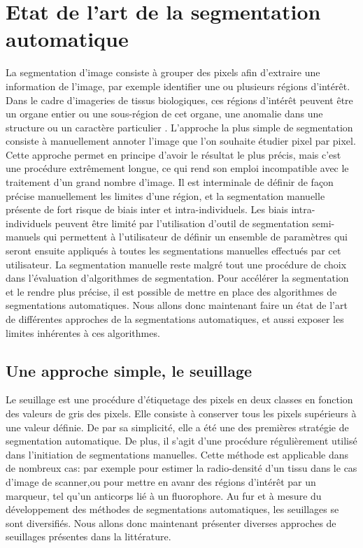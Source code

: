 \documentclass[\main/main.tex]{subfiles}
\begin{document}
            
\section{Etat de l'art de la segmentation automatique}

%
La segmentation d'image consiste à grouper des pixels afin d'extraire une information de l'image, par exemple identifier une ou plusieurs régions d'intérêt.
%
Dans le cadre d'imageries de tissus biologiques,
ces régions d'intérêt peuvent être un organe entier ou une sous\hyp{}région de cet organe\cite{early_2018,liu_2020,gupta_2018},
une anomalie dans une structure\cite{wadhwa_2019,huang_2019,ruikar_2019}
ou un caractère particulier \cite{teixid_2019,hinfray_2018} .
%
L'approche la plus simple de segmentation consiste à manuellement annoter l'image que l'on souhaite étudier pixel par pixel.
%
Cette approche permet en principe d'avoir le résultat le plus précis,
mais c'est une procédure extrêmement longue, ce qui rend son emploi incompatible avec le traitement d'un grand nombre d'image.
%
Il est interminale de définir de façon précise manuellement les limites d'une région, et la segmentation manuelle présente de fort risque de biais inter et intra\hyp{}individuels\cite{heye_2013}.
%
Les biais intra\hyp{}individuels peuvent être limité par l'utilisation d'outil de segmentation semi\hyp{}manuels\cite{berg_2019,benenson_2019} qui permettent à l'utilisateur de définir un ensemble de paramètres qui seront ensuite appliqués à toutes les segmentations manuelles effectués par cet utilisateur.
%
La segmentation manuelle reste malgré tout une procédure de choix dans l'évaluation d'algorithmes de segmentation.
%
Pour accélérer la segmentation et le rendre plus précise, il est possible de mettre en place des algorithmes de segmentations automatiques.
%
Nous allons donc maintenant faire un état de l'art de différentes approches de la segmentations automatiques, et aussi exposer les limites inhérentes à ces algorithmes.

    \subsection{Une approche simple, le seuillage}
    
%
Le seuillage est une procédure d'étiquetage des pixels en deux classes en fonction des valeurs de gris des pixels. Elle consiste à conserver tous les pixels supérieurs à une valeur définie. De par sa simplicité, elle a été une des premières stratégie de segmentation automatique\cite{sakai_1969,otsu_1979}.
%
De plus, il s'agit d'une procédure régulièrement utilisé dans l'initiation de segmentations manuelles.
%
Cette méthode est applicable dans de nombreux cas: par exemple pour estimer la radio\hyp{}densité d'un tissu dans le cas d'image de scanner,ou pour mettre en avanr des régions d'intérêt par un marqueur, tel qu'un anticorps lié à un fluorophore.
%
Au fur et à mesure du développement des méthodes de segmentations automatiques, les seuillages se sont diversifiés.
Nous allons donc maintenant présenter diverses approches de seuillages présentes dans la littérature.
\end{document}
